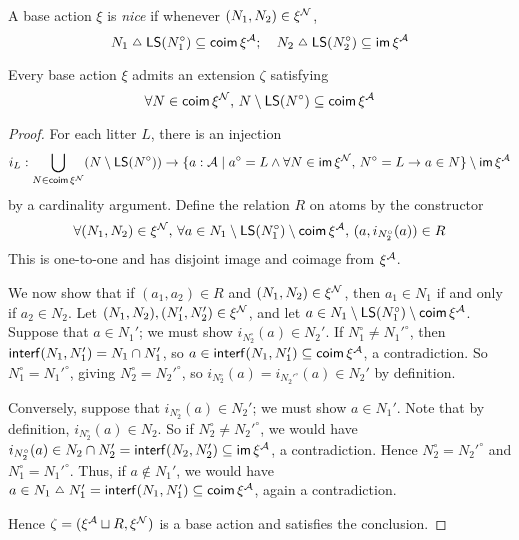 \begin{definition}
  \label{def:BaseAction.Nice}
  A base action \( \xi \) is \emph{nice} if whenever \( (N_1, N_2) \in \xi^{\mathcal N} \),
  \[ N_1 \symmdiff \LS(N_1^\circ) \subseteq \coim \xi^\Atom;\quad N_2 \symmdiff \LS(N_2^\circ) \subseteq \im \xi^\Atom \]
\end{definition}
\begin{proposition}
  \label{prop:BaseAction.exists_inside}
  Every base action \( \xi \) admits an extension \( \zeta \) satisfying
  \[ \forall N \in \operatorname{\mathsf{coim}} \xi^{\mathcal N},\, N \setminus \operatorname{\mathsf{LS}}(N^\circ) \subseteq \operatorname{\mathsf{coim}} \xi^{\mathcal A} \]
\end{proposition}
\begin{proof}
  For each litter \( L \), there is an injection
  \[ i_L : \bigcup_{N \in \operatorname{\mathsf{coim}} \xi^{\mathcal N}} (N \setminus \operatorname{\mathsf{LS}}(N^\circ)) \to \{ a : {\mathcal A} \mid a^\circ = L \wedge \forall N \in \operatorname{\mathsf{im}} \xi^{\mathcal N},\, N^\circ = L \to a \in N \} \setminus \operatorname{\mathsf{im}} \xi^{\mathcal A} \]
  by a cardinality argument.
  Define the relation \( R \) on atoms by the constructor
  \[ \forall (N_1, N_2) \in \xi^{\mathcal N},\, \forall a \in N_1 \setminus \operatorname{\mathsf{LS}}(N_1^\circ) \setminus \operatorname{\mathsf{coim}} \xi^{\mathcal A},\, (a, i_{N_2^\circ}(a)) \in R \]
  This is one-to-one and has disjoint image and coimage from \( \xi^{\mathcal A} \).

  We now show that if \( (a_1, a_2) \in R \) and \( (N_1, N_2) \in \xi^{\mathcal N} \), then \( a_1 \in N_1 \) if and only if \( a_2 \in N_2 \).
  Let \( (N_1, N_2), (N_1', N_2') \in \xi^{\mathcal N} \), and let \( a \in N_1 \setminus \operatorname{\mathsf{LS}}(N_1^\circ) \setminus \operatorname{\mathsf{coim}} \xi^{\mathcal A} \).
  Suppose that \( a \in N_1' \); we must show \( i_{N_2^\circ}(a) \in N_2' \).
  If \( N_1^\circ \neq {N_1'}^\circ \), then \( \operatorname{\mathsf{interf}}(N_1, N_1') = N_1 \cap N_1' \), so \( a \in \operatorname{\mathsf{interf}}(N_1, N_1') \subseteq \operatorname{\mathsf{coim}} \xi^{\mathcal A} \), a contradiction.
  So \( N_1^\circ = {N_1'}^\circ \), giving \( N_2^\circ = {N_2'}^\circ \), so \( i_{N_2^\circ}(a) = i_{{N_2'}^\circ}(a) \in N_2' \) by definition.

  Conversely, suppose that \( i_{N_2^\circ}(a) \in N_2' \); we must show \( a \in N_1' \).
  Note that by definition, \( i_{N_2^\circ}(a) \in N_2 \).
  So if \( N_2^\circ \neq {N_2'}^\circ \), we would have \( i_{N_2^\circ}(a) \in N_2 \cap N_2' = \operatorname{\mathsf{interf}}(N_2, N_2') \subseteq \operatorname{\mathsf{im}} \xi^{\mathcal A} \), a contradiction.
  Hence \( N_2^\circ = {N_2'}^\circ \) and \( N_1^\circ = {N_1'}^\circ \).
  Thus, if \( a \notin N_1' \), we would have \( a \in N_1 \symmdiff N_1' = \interf(N_1, N_1') \subseteq \coim \xi^\Atom \), again a contradiction.

  Hence \( \zeta = (\xi^{\mathcal A} \sqcup R, \xi^{\mathcal N}) \) is a base action and satisfies the conclusion.
\end{proof}

